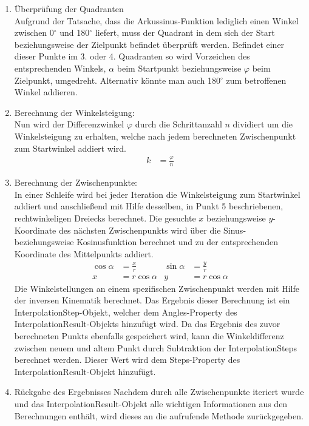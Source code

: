 \begin{itemize}
\begin{enumerate}
\item Überprüfung der Quadranten\\
Aufgrund der Tatsache, dass die Arkussinus-Funktion lediglich einen Winkel zwischen 0$^\circ$ und 180$^\circ$ liefert, muss der Quadrant in dem sich der Start beziehungsweise der Zielpunkt befindet überprüft werden. Befindet einer dieser Punkte  im 3. oder 4. Quadranten so wird Vorzeichen des entsprechenden Winkels, $\alpha$ beim Startpunkt beziehungsweise $\varphi$ beim Zielpunkt, umgedreht. Alternativ könnte man auch 180$^\circ$ zum betroffenen Winkel addieren.
\item Berechnung der Winkelsteigung:\\
Nun wird der Differenzwinkel $\varphi$ durch die Schrittanzahl $n$ dividiert um die Winkelsteigung zu erhalten, welche nach jedem berechneten Zwischenpunkt zum Startwinkel addiert wird.
\begin{align*}
k & = \frac{\varphi}{n}
\end{align*}
\item Berechnung der Zwischenpunkte:\\
In einer Schleife wird bei jeder Iteration die Winkelsteigung zum Startwinkel addiert und anschließend mit Hilfe desselben, in Punkt 5 beschriebenen, rechtwinkeligen Dreiecks berechnet. Die gesuchte $x$ beziehungsweise $y$-Koordinate des nächsten Zwischenpunkts wird über die Sinus- beziehungsweise Kosinusfunktion berechnet und zu der entsprechenden Koordinate des Mittelpunkts addiert.
\begin{align*}
\cos \alpha & = \frac{x}{r} & \sin \alpha & = \frac{y}{r}\\
x & = r \cos \alpha & y & = r \cos \alpha
\end{align*}
Die Winkelstellungen an einem spezifischen Zwischenpunkt werden mit Hilfe der inversen Kinematik berechnet. Das Ergebnis dieser Berechnung ist ein InterpolationStep-Objekt, welcher dem Angles-Property des InterpolationResult-Objekts hinzufügt wird. Da das Ergebnis des zuvor berechneten Punkts ebenfalls gespeichert wird, kann die Winkeldifferenz zwischen neuem und altem Punkt durch Subtraktion der InterpolationSteps berechnet werden. Dieser Wert wird dem Steps-Property des InterpolationResult-Objekt hinzufügt.
\item Rückgabe des Ergebnisses
Nachdem durch alle Zwischenpunkte iteriert wurde und das InterpolationResult-Objekt alle wichtigen Informationen aus den Berechnungen enthält, wird dieses an die aufrufende Methode zurückgegeben.
\end{enumerate}
\end{itemize}
